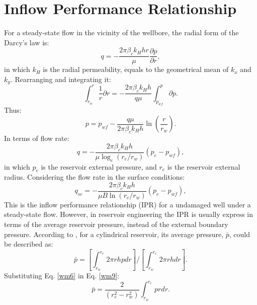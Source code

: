 \section{Inflow Performance Relationship}
For a steady-state flow in the vicinity of the wellbore, the radial form of the Darcy's law is:
\begin{equation}
\label{wm4}
q=-\frac{2\pi\beta_c k_H h r}{\mu} \frac{\partial p}{\partial r},
\end{equation}
in which $k_H$ is the radial permeability, equals to the geometrical mean of $k_x$ and $k_y$. Rearranging and integrating it:
\begin{equation}
\label{wm5}
\int_{r_w}^{r}\frac{1}{r}\partial r = -\frac{2\pi\beta_c k_H h}{q \mu}\int_{p_{wf}}^{p}\partial p.
\end{equation}
Thus:
\begin{equation}
\label{wm6}
p=p_{wf}-\frac{q \mu}{2 \pi \beta_c k_H h}\ln\left(\frac{r}{r_w}\right).
\end{equation}
In terms of flow rate:
\begin{equation}
\label{wm7}
q=-\frac{2\pi\beta_c k_H h}{\mu \log_e(r_e/r_w)} (p_e - p_{wf}),
\end{equation}
in which $p_e$ is the reservoir external pressure, and $r_e$ is the reservoir external radius. Considering the flow rate in the surface conditions:
\begin{equation}
\label{wm8}
q_{sc}=-\frac{2\pi\beta_c k_H h}{\mu B \ln(r_e/r_w)} (p_e - p_{wf}),
\end{equation}
This is the inflow performance relationship (IPR) for a undamaged well under a steady-state flow. However, in reservoir engineering the IPR is usually express in terms of the average reservoir pressure, instead of the external boundary pressure. According to \cite{Ertekin2001}, for a cylindrical reservoir, its average pressure, $\bar{p}$, could be described as:
\begin{equation}
\label{wm9}
\bar{p}=\left[ \int_{r_w}^{r_e} 2 \pi r h p dr \right]/\left[ \int_{r_w}^{r_e} 2 \pi r h dr \right].
\end{equation}
Substituting Eq. \ref{wm6} in Eq. \ref{wm9}:
\begin{equation}
\label{wm10}
\bar{p}=\frac{2}{(r_e^2-r_w^2)} \int_{r_w}^{r_e} p r dr.
\end{equation}
